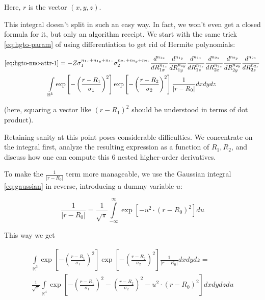 \documentclass{article}
\begin{document}
\begin{appendices}
Here, \(r\) is the vector \((x, y, z)\).

This integral doesn't split in such an easy way. In fact, we won't even get a closed formula for it, but only an algorithm receipt. We start with the same trick \eqref{eq:hgto-param} of using differentiation to get rid of Hermite polynomials:

\begin{equation} \label{eq:hgto-nuc-attr-1.1}
\begin{gathered}
\eqref{eq:hgto-nuc-attr-1} = -Z \sigma_1^{n_{1x} + n_{1y} + n_{1z}} \sigma_2^{n_{2x} + n_{2y} + n_{2z}} 
\frac{d^{n_{1x}}}{dR_{1x}^{n_{1x}}} \frac{d^{n_{1y}}}{dR_{1y}^{n_{1y}}} \frac{d^{n_{1z}}}{dR_{1z}^{n_{1z}}}
\frac{d^{n_{2x}}}{dR_{2x}^{n_{2x}}} \frac{d^{n_{2y}}}{dR_{2y}^{n_{2y}}} \frac{d^{n_{2z}}}{dR_{2z}^{n_{2z}}} \\
\int\limits_{\mathbb{R}^3} \exp\left[ -\left(\frac{r - R_1}{\sigma_1}\right)^2\right] \exp\left[ -\left(\frac{r - R_2}{\sigma_2}\right)^2\right] \frac{1}{|r - R_0|} dxdydz
\end{gathered}
\end{equation}

(here, squaring a vector like \((r-R_1)^2\) should be understood in terms of dot product).

Retaining sanity at this point poses considerable difficulties. We concentrate on the integral first, analyze the resulting expression as a function of \(R_1, R_2\), and discuss how one can compute this 6 nested higher-order derivatives.

To make the \(\frac{1}{|r-R_0|}\) term more manageable, we use the Gaussian integral \eqref{eq:gaussian} in reverse, introducing a dummy variable \(u\):

\begin{equation}
\frac{1}{|r-R_0|} = \frac{1}{\sqrt\pi} \int\limits_{-\infty}^\infty \exp\left[-u^2\cdot (r-R_0)^2\right]du
\end{equation}

This way we get

\begin{equation} \label{eq:hgto-nuc-attr-2}
\begin{gathered}
\int\limits_{\mathbb{R}^3} \exp\left[ -\left(\frac{r - R_1}{\sigma_1}\right)^2\right] \exp\left[ -\left(\frac{r - R_2}{\sigma_2}\right)^2\right] \frac{1}{|r - R_0|} dxdydz = \\
\frac{1}{\sqrt\pi} \int\limits_{\mathbb{R}^4} \exp\left[ -\left(\frac{r - R_1}{\sigma_1}\right)^2 -\left(\frac{r - R_2}{\sigma_2}\right)^2 - u^2\cdot (r-R_0)^2\right] dxdydzdu
\end{gathered}
\end{equation}


\end{appendices}
\end{document}
